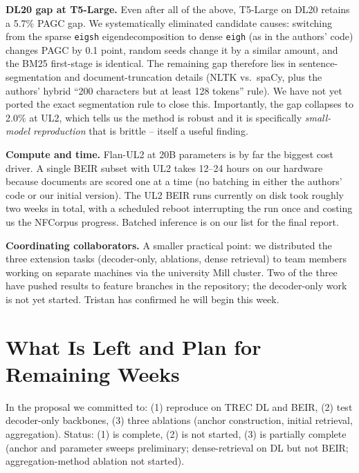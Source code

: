 \documentclass[conference]{IEEEtran}
\begin{document}
\textbf{DL20 gap at T5-Large.}
Even after all of the above, T5-Large on DL20 retains a 5.7\% PAGC gap. We systematically eliminated candidate causes: switching from the sparse \texttt{eigsh} eigendecomposition to dense \texttt{eigh} (as in the authors' code) changes PAGC by 0.1 point, random seeds change it by a similar amount, and the BM25 first-stage is identical. The remaining gap therefore lies in sentence-segmentation and document-truncation details (NLTK vs.\ spaCy, plus the authors' hybrid ``200 characters but at least 128 tokens'' rule). We have not yet ported the exact segmentation rule to close this. Importantly, the gap collapses to 2.0\% at UL2, which tells us the method is robust and it is specifically \emph{small-model reproduction} that is brittle -- itself a useful finding.

\textbf{Compute and time.}
Flan-UL2 at 20B parameters is by far the biggest cost driver. A single BEIR subset with UL2 takes 12--24 hours on our hardware because documents are scored one at a time (no batching in either the authors' code or our initial version). The UL2 BEIR runs currently on disk took roughly two weeks in total, with a scheduled reboot interrupting the run once and costing us the NFCorpus progress. Batched inference is on our list for the final report.

\textbf{Coordinating collaborators.}
A smaller practical point: we distributed the three extension tasks (decoder-only, ablations, dense retrieval) to team members working on separate machines via the university Mill cluster. Two of the three have pushed results to feature branches in the repository; the decoder-only work is not yet started. Tristan has confirmed he will begin this week.

\section{What Is Left and Plan for Remaining Weeks}

In the proposal we committed to: (1) reproduce on TREC DL and BEIR, (2) test decoder-only backbones, (3) three ablations (anchor construction, initial retrieval, aggregation). Status: (1) is complete, (2) is not started, (3) is partially complete (anchor and parameter sweeps preliminary; dense-retrieval on DL but not BEIR; aggregation-method ablation not started).
\end{document}
